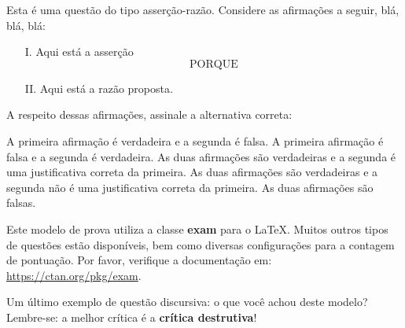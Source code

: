 \question
Esta é uma questão do tipo asserção-razão.
Considere as afirmações a seguir, blá, blá, blá:
\begin{itemize}
\item[I.] Aqui está a asserção
          \begin{equation*}
          \text{PORQUE}
          \end{equation*}
          \vspace{-0.8cm}
\item[II.] Aqui está a razão proposta.
\end{itemize}
A respeito dessas afirmações, assinale a alternativa correta:
\begin{choices}
\choice A primeira afirmação é verdadeira e a segunda é falsa.
\CorrectChoice A primeira afirmação é falsa e a segunda é verdadeira.
\choice As duas afirmações são verdadeiras e a segunda é uma justificativa
        correta da primeira.
\choice As duas afirmações são verdadeiras e a segunda não é uma justificativa
        correta da primeira.
\choice As duas afirmações são falsas.
\end{choices}


Este modelo de prova utiliza a classe \textbf{exam} para o \LaTeX. Muitos outros
tipos de questões estão disponíveis, bem como diversas configurações para a
contagem de pontuação. Por favor, verifique a documentação em:
\url{https://ctan.org/pkg/exam}.

\question
Um último exemplo de questão discursiva: o que você achou deste modelo?
Lembre-se: a melhor crítica é a \textbf{crítica destrutiva}!
\dezlinhas
